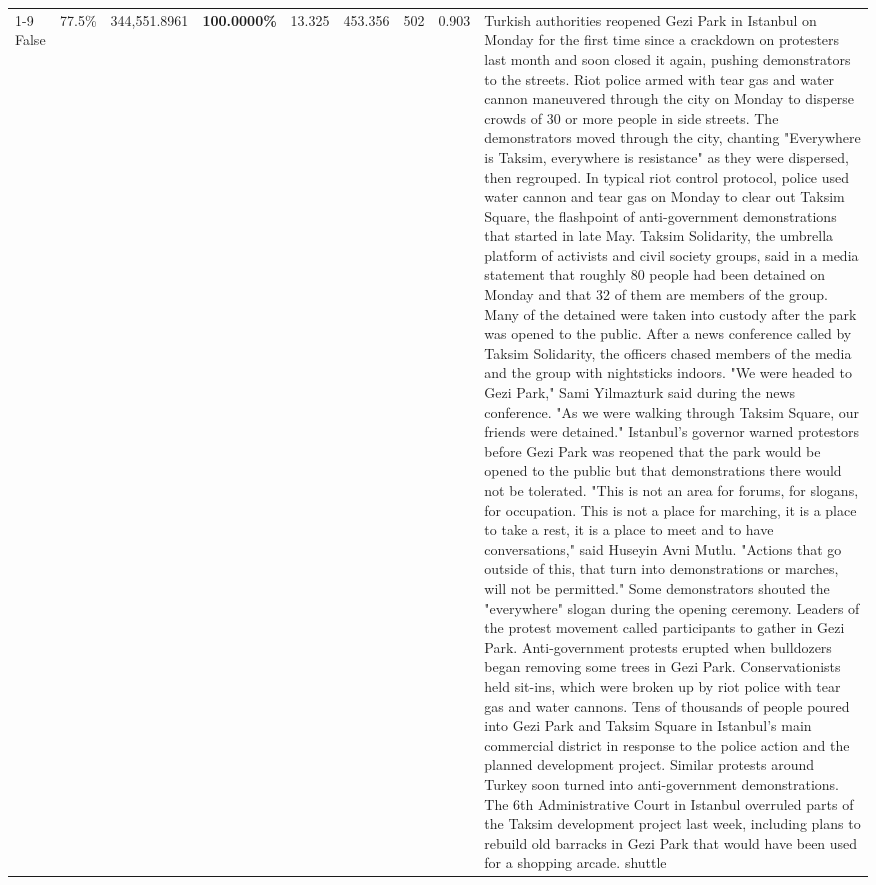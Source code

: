 \begin{table}[H]
\begin{tabular}{lllrlllll}
\cline{1-9}
False & 77.5\% & 344,551.8961 & \bfseries \color{red} 100.0000\% & 13.325 & 453.356 & 502 & 0.903 & Turkish authorities reopened Gezi Park in Istanbul on Monday for the first time since a crackdown on protesters last month and soon closed it again, pushing demonstrators to the streets. Riot police armed with tear gas and water cannon maneuvered through the city on Monday to disperse crowds of 30 or more people in side streets. The demonstrators moved through the city, chanting "Everywhere is Taksim, everywhere is resistance" as they were dispersed, then regrouped. In typical riot control protocol, police used water cannon and tear gas on Monday to clear out Taksim Square, the flashpoint of anti-government demonstrations that started in late May. Taksim Solidarity, the umbrella platform of activists and civil society groups, said in a media statement that roughly 80 people had been detained on Monday and that 32 of them are members of the group. Many of the detained were taken into custody after the park was opened to the public. After a news conference called by Taksim Solidarity, the officers chased members of the media and the group with nightsticks indoors. "We were headed to Gezi Park," Sami Yilmazturk said during the news conference. "As we were walking through Taksim Square, our friends were detained." Istanbul's governor warned protestors before Gezi Park was reopened that the park would be opened to the public but that demonstrations there would not be tolerated. "This is not an area for forums, for slogans, for occupation. This is not a place for marching, it is a place to take a rest, it is a place to meet and to have conversations," said Huseyin Avni Mutlu. "Actions that go outside of this, that turn into demonstrations or marches, will not be permitted." Some demonstrators shouted the "everywhere" slogan during the opening ceremony. Leaders of the protest movement called participants to gather in Gezi Park. Anti-government protests erupted when bulldozers began removing some trees in Gezi Park. Conservationists held sit-ins, which were broken up by riot police with tear gas and water cannons. Tens of thousands of people poured into Gezi Park and Taksim Square in Istanbul's main commercial district in response to the police action and the planned development project. Similar protests around Turkey soon turned into anti-government demonstrations. The 6th Administrative Court in Istanbul overruled parts of the Taksim development project last week, including plans to rebuild old barracks in Gezi Park that would have been used for a shopping arcade. shuttle \\

\end{tabular}
\end{table}
